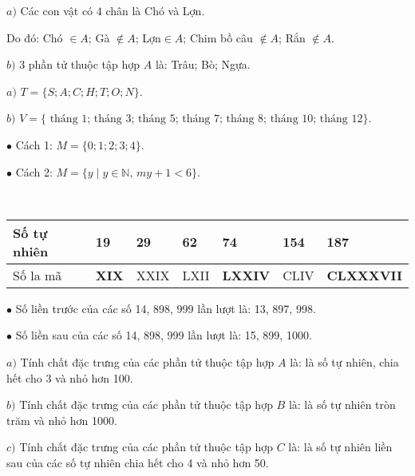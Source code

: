 \begin{Answer}{1}
			$a)$ Các con vật có $4$ chân là Chó và Lợn.
			
			Do đó: Chó $\in A$; Gà $\notin A$; Lợn$ \in A$; Chim bồ câu $\notin A$; Rắn $\notin A$.
			
			$b)$ 3 phần tử thuộc tập hợp $A$ là: Trâu; Bò; Ngựa.
	
\end{Answer}
\begin{Answer}{2}
		$a)$	$T = \{S; A; C; H; T; O; N \}$.
		
		$b)$	$V =\{\text{ tháng 1; tháng 3; tháng 5; tháng 7; tháng 8; tháng 10; tháng 12}\}$.
	
\end{Answer}
\begin{Answer}{3}
		$\bullet$	Cách 1: $M = \{0; 1; 2; 3; 4\}$.
		
		$\bullet$	Cách 2: $M = \{ y \mid y \in \mathbb{N},\, m y + 1 < 6\}$.
	
\end{Answer}
\begin{Answer}{4}
		\,\\
			\renewcommand{\arraystretch}{1.1}
			\begin{tabularx}{\textwidth}{|p{2cm}|*{6}{Y|} }
				\hline
				Số tự nhiên&	19&	\textbf{29} & \textbf{62}	&	74&	\textbf{154}&	187\\
				\hline
				Số la mã&	\textbf{XIX}&	XXIX&	LXII&	\textbf{LXXIV}&	CLIV&	\textbf{CLXXXVII}\\
				\hline
			\end{tabularx}
	
\end{Answer}
\begin{Answer}{5}
		$\bullet$	Số liền trước của các số 14, 898, 999 lần lượt là: 13, 897, 998.
		
		$\bullet$	Số liền sau của các số 14, 898, 999 lần lượt là: 15, 899, 1000.
	
\end{Answer}
\begin{Answer}{6}
		$a)$	Tính chất đặc trưng của các phần tử thuộc tập hợp $A$ là: là số tự nhiên, chia hết cho 3 và nhỏ hơn 100.
		
		$b)$	Tính chất đặc trưng của các phần tử thuộc tập hợp $B$ là: là số tự nhiên tròn trăm và nhỏ hơn 1000.
		
		$c)$	Tính chất đặc trưng của các phần tử thuộc tập hợp $C$ là: là số tự nhiên liền sau của các số tự nhiên chia hết cho 4 và nhỏ hơn 50.
	
\end{Answer}
